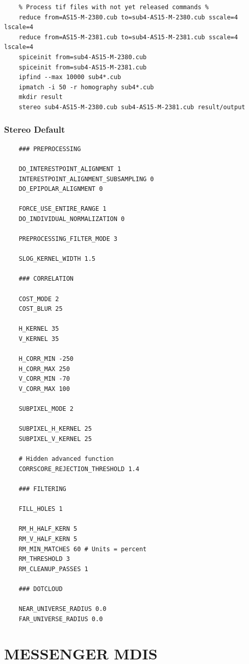 \begin{verbatim}
    % Process tif files with not yet released commands %
    reduce from=AS15-M-2380.cub to=sub4-AS15-M-2380.cub sscale=4 lscale=4
    reduce from=AS15-M-2381.cub to=sub4-AS15-M-2381.cub sscale=4 lscale=4
    spiceinit from=sub4-AS15-M-2380.cub
    spiceinit from=sub4-AS15-M-2381.cub
    ipfind --max 10000 sub4*.cub
    ipmatch -i 50 -r homography sub4*.cub
    mkdir result
    stereo sub4-AS15-M-2380.cub sub4-AS15-M-2381.cub result/output
\end{verbatim}

\subsubsection*{Stereo Default}

\begin{verbatim}
    ### PREPROCESSING

    DO_INTERESTPOINT_ALIGNMENT 1
    INTERESTPOINT_ALIGNMENT_SUBSAMPLING 0
    DO_EPIPOLAR_ALIGNMENT 0

    FORCE_USE_ENTIRE_RANGE 1
    DO_INDIVIDUAL_NORMALIZATION 0

    PREPROCESSING_FILTER_MODE 3

    SLOG_KERNEL_WIDTH 1.5

    ### CORRELATION

    COST_MODE 2
    COST_BLUR 25

    H_KERNEL 35
    V_KERNEL 35

    H_CORR_MIN -250
    H_CORR_MAX 250
    V_CORR_MIN -70
    V_CORR_MAX 100

    SUBPIXEL_MODE 2

    SUBPIXEL_H_KERNEL 25
    SUBPIXEL_V_KERNEL 25

    # Hidden advanced function
    CORRSCORE_REJECTION_THRESHOLD 1.4

    ### FILTERING

    FILL_HOLES 1

    RM_H_HALF_KERN 5
    RM_V_HALF_KERN 5
    RM_MIN_MATCHES 60 # Units = percent
    RM_THRESHOLD 3
    RM_CLEANUP_PASSES 1

    ### DOTCLOUD

    NEAR_UNIVERSE_RADIUS 0.0
    FAR_UNIVERSE_RADIUS 0.0
\end{verbatim}


\section{MESSENGER MDIS}

